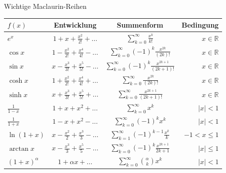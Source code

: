 \begin{minipage}{\linewidth}
\Tab Wichtige Maclaurin-Reihen

\begin{tabular}{l c c r}
    $f(x)$ & Entwicklung & Summenform & Bedingung \\
    \hline
    $e^x$ & $1 + x + \frac{x^2}{2!} + \dots$ & $\sum_{k=0}^\infty \frac{x^k}{k!}$ & $x \in \mathbb{R}$ \\[1ex]
    $\cos x$ & $1 - \frac{x^2}{2!} + \frac{x^4}{4!} - \dots$ & $\sum_{k=0}^\infty (-1)^k \frac{x^{2k}}{(2k)!}$ & $x \in \mathbb{R}$ \\[1ex]
    $\sin x$ & $x - \frac{x^3}{3!} + \frac{x^5}{5!} - \dots$ & $\sum_{k=0}^\infty (-1)^k \frac{x^{2k+1}}{(2k+1)!}$ & $x \in \mathbb{R}$ \\[1ex]
    $\cosh x$ & $1 + \frac{x^2}{2!} + \frac{x^4}{4!} + \dots$ & $\sum_{k=0}^\infty \frac{x^{2k}}{(2k)!}$ & $x \in \mathbb{R}$ \\[1ex]
    $\sinh x$ & $x + \frac{x^3}{3!} + \frac{x^5}{5!} + \dots$ & $\sum_{k=0}^\infty \frac{x^{2k+1}}{(2k+1)!}$ & $x \in \mathbb{R}$ \\[1ex]
    \hline
    $\frac{1}{1-x}$ & $1 + x + x^2 + \dots$ & $\sum_{k=0}^\infty x^k$ & $|x| < 1$ \\[1ex]
    $\frac{1}{1+x}$ & $1 - x + x^2 - \dots$ & $\sum_{k=0}^\infty (-1)^k x^k$ & $|x| < 1$ \\[1ex]
    $\ln(1+x)$ & $x - \frac{x^2}{2} + \frac{x^3}{3} - \dots$ & $\sum_{k=1}^\infty (-1)^{k-1} \frac{x^k}{k}$ & $-1 < x \le 1$ \\[1ex]
    $\arctan x$ & $x - \frac{x^3}{3} + \frac{x^5}{5} - \dots$ & $\sum_{k=0}^\infty (-1)^k \frac{x^{2k+1}}{2k+1}$ & $|x| \le 1$ \\[1ex]
    $(1+x)^\alpha$ & $1 + \alpha x + \dots$ & $\sum_{k=0}^\infty \binom{\alpha}{k} x^k$ & $|x| < 1$ \\
\end{tabular}
\end{minipage}

